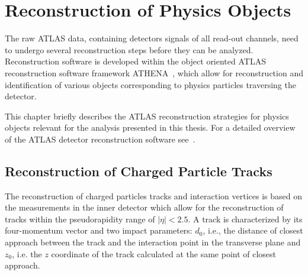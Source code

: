 \chapter{Reconstruction of Physics Objects}\label{chap:obj} \vspace{2cm}

The raw ATLAS  data, containing  detectors signals of all  read-out channels, need to
 undergo  several reconstruction steps before they can be analyzed. Reconstruction software is developed 
 within the object oriented ATLAS reconstruction software framework ATHENA~\cite{Athena}, which allow for reconstruction and 
identification of various objects corresponding to physics particles traversing the detector.


This chapter briefly describes the ATLAS reconstruction strategies for physics objects relevant for the
analysis presented in this thesis.
For a detailed overview of the ATLAS detector reconstruction software  see~\cite{AtlasCSCBook}. 

\restoregeometry
\clearpage

\section{Reconstruction of Charged Particle Tracks}
The reconstruction of charged particles tracks and interaction vertices is based on the measurements in the inner detector
which allow  for the reconstruction of tracks within the pseudorapidity range of $|\eta| < 2.5$. 
A track is characterized by its four-momentum vector and two impact parameters: $d_0$, i.e.,  the distance 
of closest approach between the track and the interaction point in the transverse plane and $z_0$, i.e.
the $z$ coordinate of the track calculated at the same point of closest approach. 


